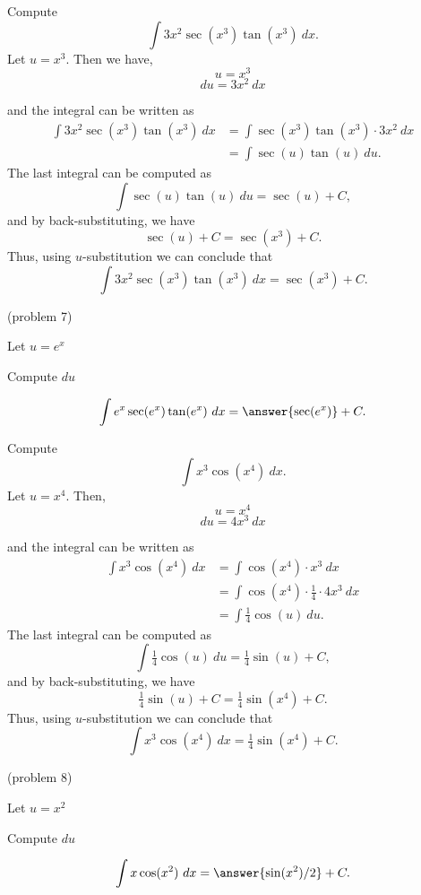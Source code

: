 \documentclass{ximera}
\begin{document}
\begin{example}[example 7] Compute 
\[\int 3x^2\sec(x^3)\tan(x^3) \ dx.\]
Let $u = x^3$.  Then we have,
\[u = x^3\]
\[du = 3x^2 \ dx\]

and the integral can be written as 
\begin{align*}
\int 3x^2\sec(x^3)\tan(x^3) \ dx &= \int \sec(x^3)\tan(x^3) \cdot 3x^2 \ dx\\
&= \int \sec(u)\tan(u) \ du.
\end{align*}
The last integral can be computed as 
\[\int \sec(u)\tan(u) \ du = \sec(u) + C,\]
and by back-substituting, we have 
\[\sec(u) + C = \sec(x^3) + C.\]
Thus, using $u$-substitution we can conclude that
\[\int 3x^2\sec(x^3)\tan(x^3) \ dx =  \sec(x^3) + C.\]
\end{example}

\begin{problem}(problem 7)
\begin{hint}
Let $u = e^x$
\end{hint}
\begin{hint}
Compute $du$
\end{hint}
\[\int e^x\sec(e^x)\tan(e^x) \ dx = \answer{\sec(e^x)} +C.\]
\end{problem}


\begin{example}[example 8] Compute 
\[\int x^3\cos(x^4) \ dx.\]
Let $u = x^4$.  Then,
\[u = x^4\]
\[du = 4x^3 \ dx\]

and the integral can be written as 
\begin{align*}
\int x^3\cos(x^4) \ dx &= \int \cos(x^4) \cdot x^3\  dx \\
&=  \int \cos(x^4)\cdot \tfrac14 \cdot 4x^3\  dx\\
&=  \int \tfrac14\cos(u) \ du.
\end{align*}
The last integral can be computed as 
\[\int \tfrac14 \cos(u) \ du = \tfrac14 \sin(u) + C,\]
and by back-substituting, we have 
\[\tfrac14 \sin(u) + C = \tfrac14 \sin(x^4) + C.\]
Thus, using $u$-substitution we can conclude that
\[\int x^3\cos(x^4) \ dx =  \tfrac14 \sin(x^4) + C.\]
\end{example}

\begin{problem}(problem 8)
\begin{hint}
Let $u = x^2$
\end{hint}
\begin{hint}
Compute $du$
\end{hint}
\[\int x\cos(x^2) \ dx = \answer{\sin(x^2)/2} +C.\]
\end{problem}
\end{document}
